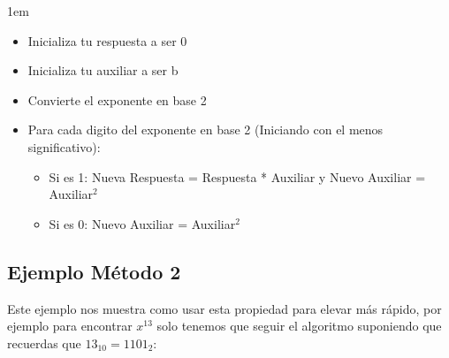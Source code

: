 \documentclass[12pt, fleqn]{report}                             %
\newenvironment{SmallIndentation}[1][0.75em]                    %
    {\begin{adjustwidth}{#1}{}\begin{footnotesize}}                 %
    {\end{footnotesize}\end{adjustwidth}}                           %
\begin{document}
            \begin{SmallIndentation}[1em]
                
                \begin{itemize}
                    \item   Inicializa tu respuesta a ser 0
                    \item   Inicializa tu auxiliar a ser b
                    \item   Convierte el exponente en base 2

                    \item Para cada digito del exponente en base 2 (Iniciando con
                          el menos significativo):
                        
                        \begin{itemize}
                            \item Si es 1:
                                    Nueva Respuesta = Respuesta * Auxiliar y Nuevo Auxiliar = Auxiliar$^2$
                            \item Si es 0:
                                    Nuevo Auxiliar = Auxiliar$^2$
                        \end{itemize}
                \end{itemize}

            \end{SmallIndentation}



        \subsection*{Ejemplo Método 2}

            Este ejemplo nos muestra como usar esta propiedad para elevar más rápido, por ejemplo para encontrar
            $x^{13}$ solo tenemos que seguir el algoritmo suponiendo que recuerdas que $13_{10} = 1101_{2}$:
\end{document}
